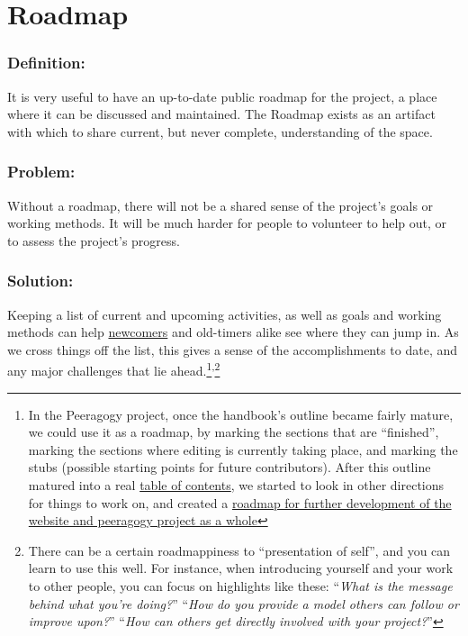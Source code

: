 \section{Roadmap}

\subsubsection*{Definition:} It is very useful to have an up-to-date public
roadmap for the project, a place where it can be discussed and
maintained. The Roadmap exists as an artifact with which to share
current, but never complete, understanding of the space.

\subsubsection*{Problem:} Without a roadmap, there will not be a shared sense of
the project's goals or working methods. It will be much harder for
people to volunteer to help out, or to assess the project's progress.

\subsubsection*{Solution:} Keeping a list of current and upcoming activities, as
well as goals and working methods can
help \href{http://peeragogy.org/practice/heuristics/newcomer/}{newcomers}
and old-timers alike see where they can jump in. As we cross things off
the list, this gives a sense of the accomplishments to date, and any
major challenges that lie ahead.\footnote{In the Peeragogy project, once the handbook's outline became fairly
  mature, we could use it as a roadmap, by marking the sections that are
  ``finished'', marking the sections where editing is currently taking
  place, and marking the stubs (possible starting points for future
  contributors). After this outline matured into a
  real \href{http://peeragogy.org/table-of-contents/}{table of contents},
  we started to look in other directions for things to work on, and
  created a \href{http://peeragogy.org/peeragogy-org-roadmap/}{roadmap
  for further development of the website and peeragogy project as a
  whole}}\textsuperscript{,}\footnote{There can be a certain roadmappiness to ``presentation of self'', and
  you can learn to use this well. For instance, when introducing
  yourself and your work to other people, you can focus on highlights
  like these: ``\emph{What is the message behind what you're doing?}''
    ``\emph{How do you provide a model others can follow or improve upon?}''
    ``\emph{How can others get directly involved with your project?}''}

